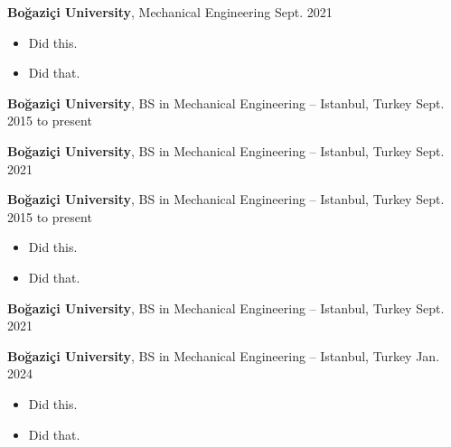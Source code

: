 \documentclass[10pt, letterpaper]{article}
\newenvironment{highlights}{
        \begin{itemize}[
                topsep=0pt,
                partopsep=0pt,
                itemsep=0pt,
                leftmargin=10pt
            ]
    }{
        \end{itemize}
    } %
\begin{document}
        \vspace{8pt}

        \textbf{Boğaziçi University}, Mechanical Engineering \hfill Sept. 2021

        \begin{highlights}
        \item Did this.
        \item Did that.
        \end{highlights}


        \vspace{8pt}

        \textbf{Boğaziçi University}, BS in Mechanical Engineering -- Istanbul, Turkey \hfill Sept. 2015 to present



        \vspace{8pt}

        \textbf{Boğaziçi University}, BS in Mechanical Engineering -- Istanbul, Turkey \hfill Sept. 2021



        \vspace{8pt}

        \textbf{Boğaziçi University}, BS in Mechanical Engineering -- Istanbul, Turkey \hfill Sept. 2015 to present

        \begin{highlights}
        \item Did this.
        \item Did that.
        \end{highlights}


        \vspace{8pt}

        \textbf{Boğaziçi University}, BS in Mechanical Engineering -- Istanbul, Turkey \hfill Sept. 2021



        \vspace{8pt}

        \textbf{Boğaziçi University}, BS in Mechanical Engineering -- Istanbul, Turkey \hfill Jan. 2024

        \begin{highlights}
        \item Did this.
        \item Did that.
        \end{highlights}


        \vspace{8pt}
\end{document}
